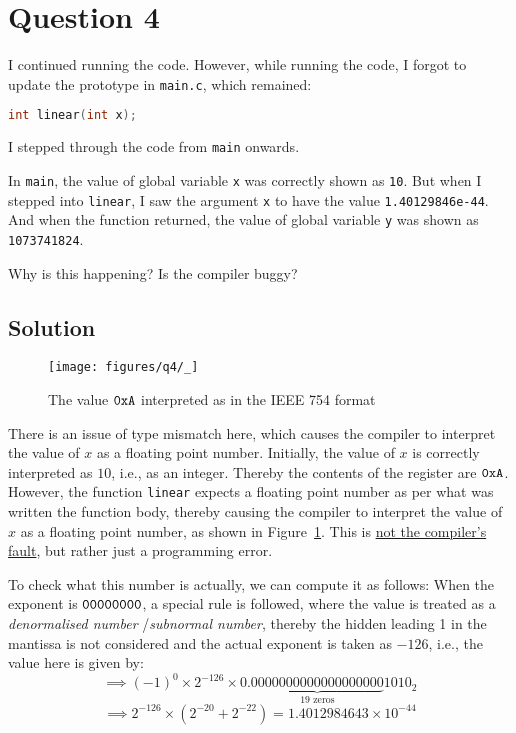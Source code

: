 \section*{Question 4}

I continued running the code.
However, while running the code, I forgot to update the prototype in \texttt{main.c}, which remained:
\begin{lstlisting}[language=C]
int linear(int x);
\end{lstlisting}

I stepped through the code from \texttt{main} onwards.

In \texttt{main}, the value of global variable \texttt{x} was correctly shown as \texttt{10}.
But when I stepped into \texttt{linear}, I saw the argument \texttt{x} to have the value \texttt{1.40129846e-44}.
And when the function returned, the value of global variable \texttt{y} was shown as \texttt{1073741824}.

Why is this happening?
Is the compiler buggy?

\subsection*{Solution}

\begin{figure*}[htbp]
    \centering
    \texttt{[image: figures/q4/\_]}
    \setlength{\abovecaptionskip}{-12pt}
    \caption{
        The value \( \texttt{0xA} \) interpreted as in the IEEE 754 format
    }\label{fig:q4}
\end{figure*}

There is an issue of type mismatch here, which causes the compiler to interpret the value of \( x \) as a floating point number.
Initially, the value of \( x \) is correctly interpreted as \( 10 \), i.e., as an integer.
Thereby the contents of the register are \( \texttt{0xA} \).
However, the function \texttt{linear} expects a floating point number as per what was written the function body, thereby causing the compiler to interpret the value of \( x \) as a floating point number, as shown in Figure~\ref{fig:q4}.
This is \underline{not the compiler's fault}, but rather just a programming error.

To check what this number is actually, we can compute it as follows:
When the exponent is \( \texttt{00000000} \), a special rule is followed, where the value is treated as a \textit{denormalised number} /\textit{subnormal number}, thereby the hidden leading 1 in the mantissa is not considered and the actual exponent is taken as \( -126 \), i.e., the value here is given by:
\[
    \implies
    {(-1)}^0 \times 2^{ -126 } \times 0.\underbrace{0000000000000000000}_{19\text{ zeros}}1010_{2}
\]
\begin{equation*}
    \implies
    2^{ - 126 } \times (2^{-20} + 2^{-22})
    =
    \boxed{
        1.4012984643 \times 10^{-44}
    }
\end{equation*}

